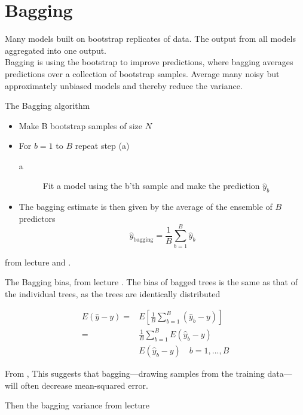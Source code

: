 \section{Bagging}

Many models built on bootstrap replicates of data. The output from all models aggregated into one output. \\

Bagging is using the bootstrap to improve predictions, where bagging averages predictions over a collection of bootstrap samples. Average many noisy but approximately unbiased models and thereby reduce the variance.

The Bagging algorithm

\begin{itemize}
  \item Make B bootstrap samples of size $N$
  \item For $b = 1$ to $B$ repeat step (a)
        \begin{description}
           \item[a] Fit a model using the b'th sample and make the prediction $\hat{y}_b$
         \end{description}
  \item The bagging estimate is then given by the average of the ensemble of $B$ predictors
      \[
        \hat{y}_\text{bagging} = \frac{1}{B} \sum_{b = 1}^{B} \hat{y}_b
      \]
\end{itemize}

from lecture \cite[p.~6-8]{lecture9} and \cite[p.~282]{friedman2016elements}.

The Bagging bias, from lecture \cite[p.~14]{lecture9}. The bias of bagged trees is the same as that of the individual trees, as the trees are identically distributed

\begin{equation}
  \begin{split}
     E(\hat{y} -y) =& E \left[ \frac{1}{B} \sum_{b=1}^{B} (\hat{y}_b -y)\right] \\
       = & \frac{1}{B} \sum_{b=1}^{B} E(\hat{y}_b -y) \\
       & E(\hat{y}_b -y) \quad b=1, ..., B
  \end{split}
\end{equation}

From \cite[p.~285]{friedman2016elements}, This suggests that bagging—drawing samples
from the training data— will often decrease mean-squared error.

Then the bagging variance from lecture  \cite[p.~15]{lecture9}

